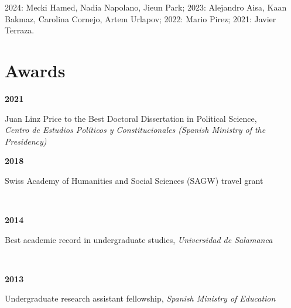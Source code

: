 \documentclass[a4paper, 12pt]{article}
\begin{document}
2024: Mecki Hamed, Nadia Napolano, Jieun Park;
2023: Alejandro Aisa, Kaan Bakmaz, Carolina Cornejo, Artem Urlapov;
2022: Mario Pirez;
2021: Javier Terraza.

\section*{Awards}


\begin{minipage}[t]{0.1\textwidth}
\textbf{2021}
\end{minipage}\hfill\begin{minipage}[t]{0.9\textwidth}
Juan Linz Price to the Best Doctoral Dissertation in Political Science,\\\textit{Centro de Estudios Políticos y Constitucionales (Spanish Ministry of the Presidency)}\\\vspace{-8pt}
\end{minipage}
\begin{minipage}[t]{0.1\textwidth}
\textbf{2018}
\end{minipage}\hfill\begin{minipage}[t]{0.9\textwidth}
Swiss Academy of Humanities and Social Sciences (SAGW) travel grant
\end{minipage}\\
\begin{minipage}[t]{0.1\textwidth}
\textbf{2014}
\end{minipage}\hfill\begin{minipage}[t]{0.9\textwidth}
Best academic record in undergraduate studies, {\it Universidad de Salamanca}
\end{minipage}\\
\begin{minipage}[t]{0.1\textwidth}
\textbf{2013}
\end{minipage}\hfill\begin{minipage}[t]{0.9\textwidth}
Undergraduate research assistant fellowship, {\it Spanish Ministry of Education}
\end{minipage}\\
\end{document}
